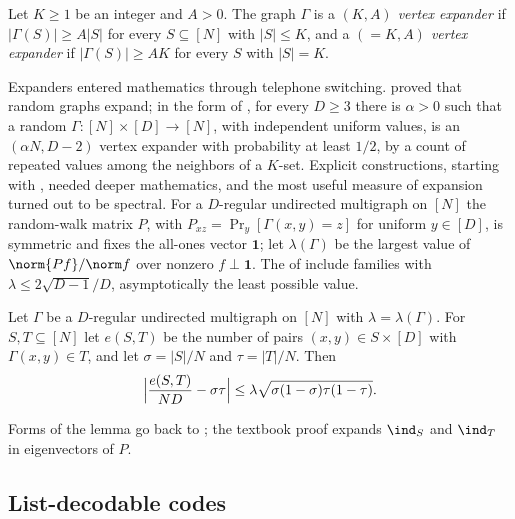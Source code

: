 \begin{refsection}
\begin{definition}\label{def:pseudorandom:expander}
Let $K\ge1$ be an integer and $A>0$. The graph $\Gamma$ is a \emph{$(K,A)$ vertex expander} if $|\Gamma(S)|\ge A|S|$ for every $S\subseteq[N]$ with $|S|\le K$, and a \emph{$({=}K,A)$ vertex expander} if $|\Gamma(S)|\ge AK$ for every $S$ with $|S|=K$.
\end{definition}

Expanders entered mathematics through telephone switching. \textcite{Pinsker1973} proved that random graphs expand; in the form of \textcite[Theorem~4.4]{Vadhan2012}, for every $D\ge3$ there is $\alpha>0$ such that a random $\Gamma\colon[N]\times[D]\to[N]$, with independent uniform values, is an $(\alpha N,D-2)$ vertex expander with probability at least $1/2$, by a count of repeated values among the neighbors of a $K$-set. Explicit constructions, starting with \textcite{Margulis1973}, needed deeper mathematics, and the most useful measure of expansion turned out to be spectral. For a $D$-regular undirected multigraph on $[N]$ the random-walk matrix $P$, with $P_{xz}=\Pr_y[\Gamma(x,y)=z]$ for uniform $y\in[D]$, is symmetric and fixes the all-ones vector $\mathbf1$; let $\lambda(\Gamma)$ be the largest value of $\norm{Pf}/\norm f$ over nonzero $f\perp\mathbf1$. The  of \textcite{LubotzkyPhillipsSarnak1988} include families with $\lambda\le2\sqrt{D-1}/D$, asymptotically the least possible value.

\begin{theorem}\label{thm:pseudorandom:mixing}
Let $\Gamma$ be a $D$-regular undirected multigraph on $[N]$ with $\lambda=\lambda(\Gamma)$. For $S,T\subseteq[N]$ let $e(S,T)$ be the number of pairs $(x,y)\in S\times[D]$ with $\Gamma(x,y)\in T$, and let $\sigma=|S|/N$ and $\tau=|T|/N$. Then
\[
  \Bigl|\frac{e(S,T)}{ND}-\sigma\tau\Bigr|\le\lambda\sqrt{\sigma(1-\sigma)\tau(1-\tau)}.
\]
\end{theorem}

Forms of the lemma go back to \textcite{AlonChung1988}; the textbook proof expands $\ind_S$ and $\ind_T$ in eigenvectors of $P$.

\subsection{List-decodable codes}\label{sec:pseudorandom:codes}


\end{refsection}

